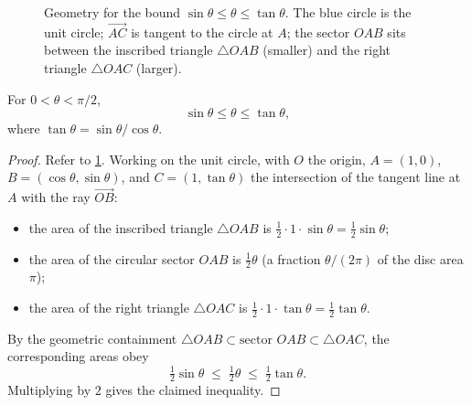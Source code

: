 \begin{figure}[H]
\centering
{}
\caption{Geometry for the bound \(\sin \theta \leq \theta \leq \tan \theta\). The blue circle is the unit circle; \(\overrightarrow{AC}\) is tangent to the circle at \(A\); the sector \(OAB\) sits between the inscribed triangle \(\triangle OAB\) (smaller) and the right triangle \(\triangle OAC\) (larger).}
\label{fig:sector-bound}
\end{figure}

\begin{proposition}\label{prop:sector-inequality}
For \(0 < \theta < \pi/2\),
\[
\sin \theta \leq \theta \leq \tan \theta,
\]
where \(\tan \theta = \sin \theta / \cos \theta\).
\end{proposition}

\begin{proof}
Refer to \cref{fig:sector-bound}. Working on the unit circle, with \(O\) the origin, \(A = (1, 0)\), \(B = (\cos \theta, \sin \theta)\), and \(C = (1, \tan \theta)\) the intersection of the tangent line at \(A\) with the ray \(\overrightarrow{OB}\):
\begin{itemize}
    \item the area of the inscribed triangle \(\triangle OAB\) is \(\tfrac{1}{2} \cdot 1 \cdot \sin \theta = \tfrac{1}{2} \sin \theta\);
    \item the area of the circular sector \(OAB\) is \(\tfrac{1}{2} \theta\) (a fraction \(\theta / (2\pi)\) of the disc area \(\pi\));
    \item the area of the right triangle \(\triangle OAC\) is \(\tfrac{1}{2} \cdot 1 \cdot \tan \theta = \tfrac{1}{2} \tan \theta\).
\end{itemize}
By the geometric containment \(\triangle OAB \subset \text{sector } OAB \subset \triangle OAC\), the corresponding areas obey
\[
\tfrac{1}{2} \sin \theta \;\leq\; \tfrac{1}{2} \theta \;\leq\; \tfrac{1}{2} \tan \theta.
\]
Multiplying by \(2\) gives the claimed inequality.
\end{proof}

